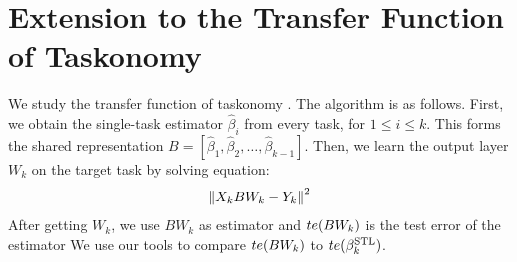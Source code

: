 \section{Extension to the Transfer Function of Taskonomy}

We study the transfer function of taskonomy \cite{ZSSGM18}.
The algorithm is as follows.
First, we obtain the single-task estimator $\hat{\beta}_i$ from every task, for $1\le i \le k$.
This forms the shared representation $B = [\hat{\beta}_1,\hat{\beta}_2,\dots,\hat{\beta}_{k-1}]$.
Then, we learn the output layer $W_k$ on the target task by solving equation:
\begin{align}
	\left\| X_k B W_k - Y_k \right\|^2
\end{align}
After getting $W_k$, we use $B W_k$ as estimator and $te(B W_k)$ is the test error of the estimator
We use our tools to compare $te(B W_k)$ to $te(\beta_k^{\text{STL}})$.

